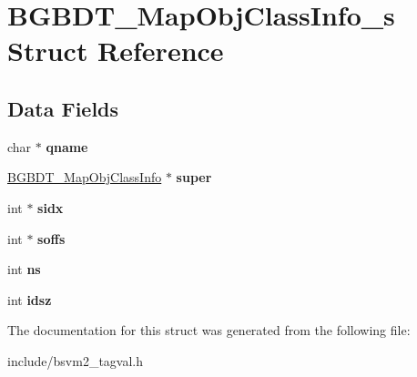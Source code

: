 \hypertarget{structBGBDT__MapObjClassInfo__s}{\section{B\-G\-B\-D\-T\-\_\-\-Map\-Obj\-Class\-Info\-\_\-s Struct Reference}
\label{structBGBDT__MapObjClassInfo__s}
}
\subsection*{Data Fields}
\begin{DoxyCompactItemize}
\item 
\hypertarget{structBGBDT__MapObjClassInfo__s_ac563bac327586ca6def480021072edf6}{char $\ast$ {\bfseries qname}}\label{structBGBDT__MapObjClassInfo__s_ac563bac327586ca6def480021072edf6}

\item 
\hypertarget{structBGBDT__MapObjClassInfo__s_afb22070ee49a0867fc15e4cd5b7780e5}{\hyperlink{structBGBDT__MapObjClassInfo__s}{B\-G\-B\-D\-T\-\_\-\-Map\-Obj\-Class\-Info} $\ast$ {\bfseries super}}\label{structBGBDT__MapObjClassInfo__s_afb22070ee49a0867fc15e4cd5b7780e5}

\item 
\hypertarget{structBGBDT__MapObjClassInfo__s_acc9f23332d3830b65d6f6487b2a10e4a}{int $\ast$ {\bfseries sidx}}\label{structBGBDT__MapObjClassInfo__s_acc9f23332d3830b65d6f6487b2a10e4a}

\item 
\hypertarget{structBGBDT__MapObjClassInfo__s_a391bb0077d2d438832afd30cd5e1d21e}{int $\ast$ {\bfseries soffs}}\label{structBGBDT__MapObjClassInfo__s_a391bb0077d2d438832afd30cd5e1d21e}

\item 
\hypertarget{structBGBDT__MapObjClassInfo__s_a3c686312bdd1a3bc8e30d95dd2186c80}{int {\bfseries ns}}\label{structBGBDT__MapObjClassInfo__s_a3c686312bdd1a3bc8e30d95dd2186c80}

\item 
\hypertarget{structBGBDT__MapObjClassInfo__s_ab16eeea5c1e5bb880dd4be7017436849}{int {\bfseries idsz}}\label{structBGBDT__MapObjClassInfo__s_ab16eeea5c1e5bb880dd4be7017436849}

\end{DoxyCompactItemize}


The documentation for this struct was generated from the following file\-:\begin{DoxyCompactItemize}
\item 
include/bsvm2\-\_\-tagval.\-h\end{DoxyCompactItemize}
